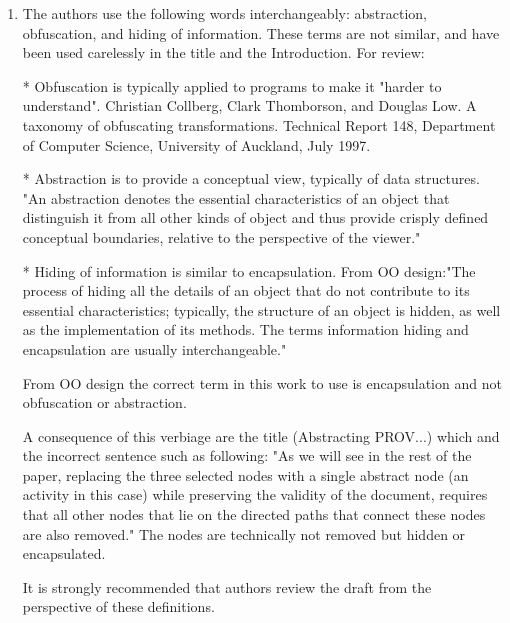 \documentclass{article}
\newcommand{\showColour}{yes} %
\newcommand{\showComments}{yes} %
\newcommand{\note}[2]{\ifthenelse{\equal{\showColour}{yes}}{\textcolor{#1}{#2}}{#2}}
\newcommand{\jwb}[1]{\note{blue}{#1}}
\newcommand{\com}[2]{\ifthenelse{\equal{\showComments}{yes}}{\textcolor{#1}{#2}}{}}
\newcommand{\comment}[1]{\com{red}{#1}}
\begin{document}
\begin{enumerate}
\item The authors use the following words interchangeably: abstraction, obfuscation, and hiding of information. These terms are not similar, and have been used carelessly in the title and the Introduction. For review:

* Obfuscation is typically applied to programs to make it "harder to understand". Christian Collberg, Clark Thomborson, and Douglas Low. A taxonomy of obfuscating transformations. Technical Report 148, Department of Computer Science, University of Auckland, July 1997.

* Abstraction is to provide a conceptual view, typically of data structures.  "An abstraction denotes the essential characteristics of an object that distinguish it from all other kinds of object and thus provide crisply defined conceptual boundaries, relative to the perspective of the viewer."

* Hiding of information is similar to encapsulation. From OO design:"The process of hiding all the details of an object that do not contribute to its essential characteristics; typically, the structure of an object is hidden, as well as the implementation of its methods. The terms information hiding and encapsulation are usually interchangeable."


From OO design the correct term in this work to use is encapsulation and not obfuscation or abstraction.

A consequence of this verbiage are the title (Abstracting PROV...) which and the incorrect sentence such as following: "As we will see in the rest of the paper, replacing the three selected nodes with a single abstract node (an activity in this case) while preserving the validity of the document, requires that all other nodes that lie on the directed paths that connect these nodes are also removed." The nodes are technically not removed but hidden or encapsulated. 

It is strongly recommended that authors review the draft from the perspective of these definitions. 





\end{enumerate}
\end{document}
